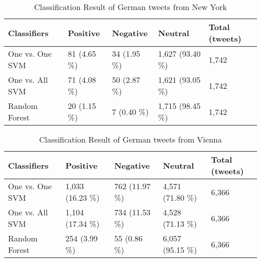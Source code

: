 \begin{table}[ht]
	\caption{Classification Result of German tweets from New York}
	\begin{tabular}{|l|p{1.8cm}|p{1.8cm}|p{1.8cm}|p{1.8cm}|} \hline
	Classifiers & Positive & Negative & Neutral & Total (tweets)\\ \hline
One vs. One SVM & 81 \newline(4.65 \%)& 34 \newline(1.95 \%)& 1,627 (93.40 \%)& 1,742 \\ \hline
One vs. All SVM & 71 \newline(4.08 \%)& 50 \newline(2.87 \%)& 1,621 (93.05 \%)& 1,742 \\ \hline
Random Forest   & 20 \newline(1.15 \%)& 7  \newline(0.40 \%)& 1,715 (98.45 \%)& 1,742 \\ \hline

	\end{tabular}
	\label{tab:result_ny_de}
\end{table}


\begin{table}[ht]
	\caption{Classification Result of German tweets from Vienna}
	\begin{tabular}{|l|p{1.8cm}|p{1.8cm}|p{1.8cm}|p{1.8cm}|} \hline
	Classifiers & Positive & Negative & Neutral & Total (tweets)\\ \hline
	
	One vs. One SVM & 1,033 (16.23 \%)& 762 \newline(11.97 \%)& 4,571 (71.80 \%)& 6,366 \\ \hline
	One vs. All SVM & 1,104 (17.34 \%)& 734 \newline(11.53 \%)& 4,528 (71.13 \%)& 6,366 \\ \hline
	Random Forest   & 254 \newline(3.99 \%) & 55 \newline(0.86 \%) & 6,057 (95.15 \%)& 6,366 \\ \hline
	\end{tabular}
	\label{tab:result_vienna_de}
\end{table}

\begin{comment}
London
N.Y or San Francisco

\end{comment}

\clearpage
